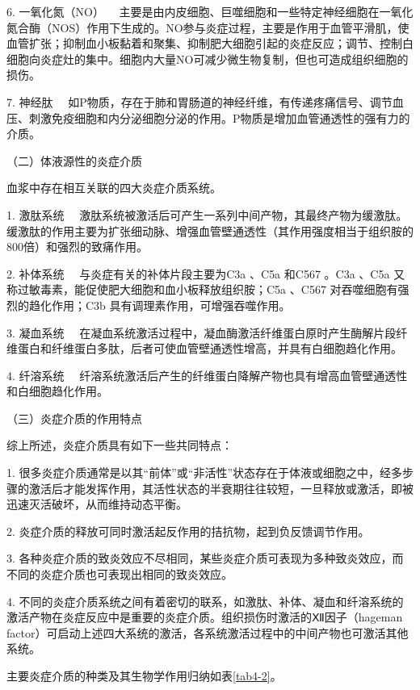 {6. 一氧化氮（NO）}
　主要是由内皮细胞、巨噬细胞和一些特定神经细胞在一氧化氮合酶（NOS）作用下生成的。NO参与炎症过程，主要是作用于血管平滑肌，使血管扩张；抑制血小板黏着和聚集、抑制肥大细胞引起的炎症反应；调节、控制白细胞向炎症灶的集中。细胞内大量NO可减少微生物复制，但也可造成组织细胞的损伤。

{7. 神经肽}
　如P物质，存在于肺和胃肠道的神经纤维，有传递疼痛信号、调节血压、刺激免疫细胞和内分泌细胞分泌的作用。P物质是增加血管通透性的强有力的介质。

{（二）体液源性的炎症介质}

血浆中存在相互关联的四大炎症介质系统。

{1. 激肽系统}
　激肽系统被激活后可产生一系列中间产物，其最终产物为缓激肽。缓激肽的作用主要为扩张细动脉、增强血管壁通透性（其作用强度相当于组织胺的800倍）和强烈的致痛作用。

{2. 补体系统} 　与炎症有关的补体片段主要为C{3a} 、C{5a} 和C{567} 。C{3a}
、C{5a} 又称过敏毒素，能促使肥大细胞和血小板释放组织胺；C{5a} 、C{567}
对吞噬细胞有强烈的趋化作用；C{3b} 具有调理素作用，可增强吞噬作用。

{3. 凝血系统}
　在凝血系统激活过程中，凝血酶激活纤维蛋白原时产生酶解片段纤维蛋白和纤维蛋白多肽，后者可使血管壁通透性增高，并具有白细胞趋化作用。

{4. 纤溶系统}
　纤溶系统激活后产生的纤维蛋白降解产物也具有增高血管壁通透性和白细胞趋化作用。

{（三）炎症介质的作用特点}

综上所述，炎症介质具有如下一些共同特点：

1.
很多炎症介质通常是以其“前体”或“非活性”状态存在于体液或细胞之中，经多步骤的激活后才能发挥作用，其活性状态的半衰期往往较短，一旦释放或激活，即被迅速灭活破坏，从而维持动态平衡。

2. 炎症介质的释放可同时激活起反作用的拮抗物，起到负反馈调节作用。

3.
各种炎症介质的致炎效应不尽相同，某些炎症介质可表现为多种致炎效应，而不同的炎症介质也可表现出相同的致炎效应。

4.
不同的炎症介质系统之间有着密切的联系，如激肽、补体、凝血和纤溶系统的激活产物在炎症反应中是重要的炎症介质。组织损伤时激活的Ⅻ因子（hageman
factor）可启动上述四大系统的激活，各系统激活过程中的中间产物也可激活其他系统。

主要炎症介质的种类及其生物学作用归纳如表\ref{tab4-2}。

